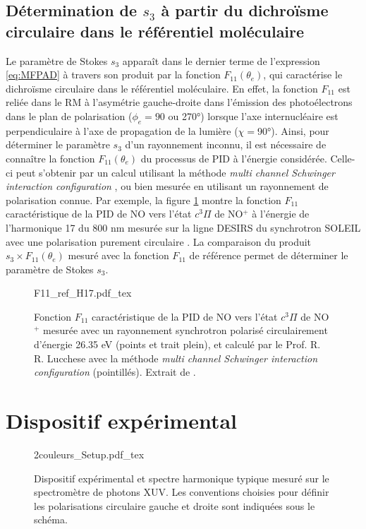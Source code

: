 \subsection{Détermination de $s_3$ à partir du dichroïsme circulaire dans le référentiel moléculaire}
Le paramètre de Stokes $s_3$ apparaît dans le dernier terme de l'expression \ref{eq:MFPAD} à travers son produit par la fonction $F_{11}(\theta_e)$, qui caractérise le dichroïsme circulaire dans le référentiel moléculaire. En effet, la fonction $F_{11}$ est reliée dans le RM à l'asymétrie gauche-droite dans l'émission des photoélectrons dans le plan de polarisation ($\phi_e = 90$ ou 270°) lorsque l'axe internucléaire est perpendiculaire à l'axe de propagation de la lumière ($\chi =$90°). Ainsi, pour déterminer le paramètre $s_3$ d'un rayonnement inconnu, il est nécessaire de connaître la fonction $F_{11}(\theta_e)$ du processus de PID à l'énergie considérée. Celle-ci peut s'obtenir par un calcul utilisant la méthode \textit{multi channel Schwinger interaction configuration} , ou bien mesurée en utilisant un rayonnement de polarisation connue. Par exemple, la figure \ref{fig:F11_ref_H17} montre la fonction $F_{11}$ caractéristique de la PID de NO vers l'état $c ^3\Pi$ de NO$^+$ à l'énergie de l'harmonique 17 du 800 nm mesurée sur la ligne DESIRS du synchrotron SOLEIL avec une polarisation purement circulaire . La comparaison du produit $s_3 \times F_{11}(\theta_e)$ mesuré avec la fonction $F_{11}$ de référence permet de déterminer le paramètre de Stokes $s_3$. 

\begin{figure}
\centering
\def\svgwidth{0.6\textwidth}
{F11_ref_H17.pdf_tex}
\caption{Fonction $F_{11}$ caractéristique de la PID de NO vers l'état $c ^3\Pi$ de NO$^+$ mesurée avec un rayonnement synchrotron polarisé circulairement d'énergie 26.35 eV (points et trait plein), et calculé par le Prof. R. R. Lucchese avec la méthode \textit{multi channel Schwinger interaction configuration} (pointillés). Extrait de .}
\label{fig:F11_ref_H17}
\end{figure}

\section{Dispositif expérimental}
\begin{figure}
\centering
\def\svgwidth{\textwidth}
{2couleurs_Setup.pdf_tex}
\caption{Dispositif expérimental et spectre harmonique typique mesuré sur le spectromètre de photons XUV. Les conventions choisies pour définir les polarisations circulaire gauche et droite sont indiquées sous le schéma.}
\label{fig:2couleurs_Setup}
\end{figure}

